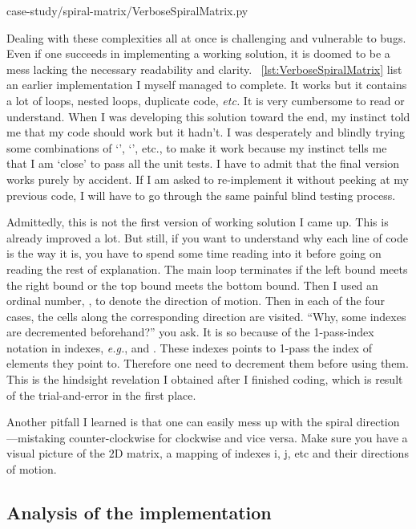 \begin{clisting}
    
    {case-study/spiral-matrix/VerboseSpiralMatrix.py}
\end{clisting}\newpage

Dealing with these complexities all at once is challenging and vulnerable to bugs.
Even if one succeeds in implementing a working solution, it is doomed to be a mess lacking the
necessary readability and clarity.
~\autoref{lst:VerboseSpiralMatrix} list an earlier implementation I myself managed to complete.
It works but it contains a lot of loops, nested loops, duplicate code, \textit{etc.}
It is very cumbersome to read or understand.
When I was developing this solution toward the end, my instinct told me that my code should work
but it hadn't.
I was desperately and blindly trying some combinations of `', `', etc., to
make it work
because my instinct tells me that I am `close' to pass all the unit tests.
I have to admit that the final version works purely by accident.
If I am asked to re-implement it without peeking at my previous code, I will have to go
through the same painful blind testing process.


Admittedly, this is not the first version of working solution I came up.
This is already improved a lot.
But still, if you want to understand why each line of code is the way it is, you have to spend some
time reading into it before going on reading the rest of explanation.
The main loop terminates if the left bound meets the right bound or the top bound meets the
bottom bound.
Then I used an ordinal number, , to denote the direction of motion.
Then in each of the four cases, the cells along the corresponding direction are visited.
``Why, some indexes are decremented beforehand?'' you ask.
It is so because of the 1-pass-index notation in indexes, \textit{e.g.},  and .
These indexes points to 1-pass the index of elements they point to.
Therefore one need to decrement them before using them.
This is the hindsight revelation I obtained after I finished coding, which is result of the
trial-and-error in the first place.

Another pitfall I learned is that one can easily mess up with the spiral
direction---mistaking counter-clockwise for clockwise and vice versa.
Make sure you have a visual picture of the $2$D matrix, a mapping of indexes i, j, etc and their
directions of motion.

\subsection{Analysis of the implementation}\label{subsec:implement.analysis.spiral-matrix}

